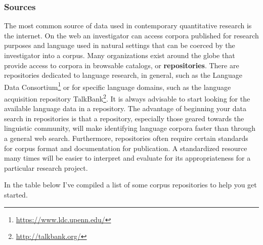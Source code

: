 \documentclass[
  letterpaper,
]{scrbook}
\DeclareRobustCommand{\href}[2]{#2\footnote{\url{#1}}}
\begin{document}
\hypertarget{sources}{%
\subsubsection{Sources}\label{sources}}

The most common source of data used in contemporary quantitative
research is the internet. On the web an investigator can access corpora
published for research purposes and language used in natural settings
that can be coerced by the investigator into a corpus. Many
organizations exist around the globe that provide access to corpora in
browsable catalogs, or \textbf{repositories}. There are repositories
dedicated to language research, in general, such as the
\href{https://www.ldc.upenn.edu/}{Language Data Consortium} or for
specific language domains, such as the language acquisition repository
\href{http://talkbank.org/}{TalkBank}. It is always advisable to start
looking for the available language data in a repository. The advantage
of beginning your data search in repositories is that a repository,
especially those geared towards the linguistic community, will make
identifying language corpora faster than through a general web search.
Furthermore, repositories often require certain standards for corpus
format and documentation for publication. A standardized resource many
times will be easier to interpret and evaluate for its appropriateness
for a particular research project.

In the table below I've compiled a list of some corpus repositories to
help you get started.
\end{document}
